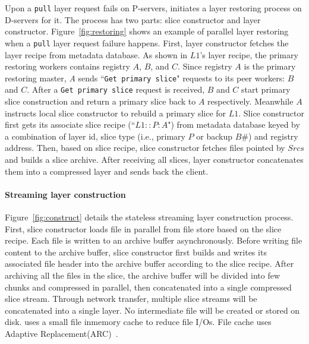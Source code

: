 Upon a \texttt{pull} layer request fails on P-servers,
\sysname initiates a layer restoring process on D-servers for it.
The process has two parts: slice constructor and layer constructor.
Figure~\ref{fig:restoring} shows an example of parallel layer restoring when a \texttt{pull} layer request failure happens.
First, 
layer constructor fetches the layer recipe from metadata database.
As shown in $L1$'s layer recipe, 
the primary restoring workers contains registry $A$, $B$, and $C$.
Since registry $A$ is the primary restoring master,
\emph{A} sends ``\texttt{Get primary slice}" requests to its peer workers: $B$ and $C$.
After a \texttt{Get primary slice} request is received, 
$B$ and $C$ start primary slice construction and return a primary slice back to $A$ respectively.
Meanwhile $A$ instructs local slice constructor to rebuild a primary slice for $L1$.
Slice constructor first gets its associate slice recipe (``$L1::P:A$") from metadata database 
keyed by a combination of  layer id, slice type (i.e., primary $P$ or backup $B \#$) and registry address.
Then, based on slice recipe,
slice constructor fetches files pointed by $Srcs$
and builds a slice archive.
After receiving all slices, layer constructor concatenates them into a compressed layer
and sends back the client. 

\paragraph{Streaming layer construction}
Figure~\ref{fig:construct} details the stateless streaming layer construction process.
First, slice constructor loads file in parallel from file store based on the slice recipe.
Each file is written to an archive buffer asynchronously.
Before writing file content to the archive buffer, slice constructor first builds and writes its
associated 
file header into the archive buffer according to the slice recipe. 
After archiving all the files in the slice,
the archive buffer will be divided into few chunks and compressed in parallel,
then concatenated into a single compressed slice stream.
Through network transfer, multiple slice streams will be concatenated into a single layer.
No intermediate file will be created or stored on disk. %
\sysname uses a small file inmemory cache to reduce file I/Os. 
File cache uses Adaptive Replacement(ARC)~\cite{xxx}.

 
